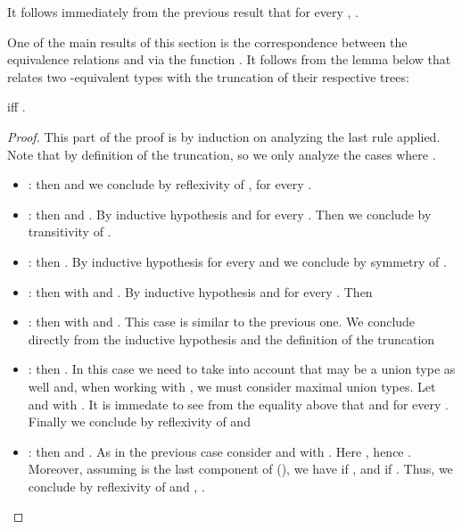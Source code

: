 \begin{remark}
\label{rem:cutFiniteUnfolding}
It follows immediately from the previous result that for every ,
.
\end{remark}



One of the main results of this section is the correspondence between the
equivalence relations  and  via the function
. It follows from the lemma below that relates two
-equivalent types with the truncation of their respective trees:

\begin{lemma}
\label{lem:cutEquivalenceMu}
 iff .
\end{lemma}

\begin{proof}
 This part of the proof is by induction on 
analyzing the last rule applied. Note that  by definition of the truncation, so we only analyze the
cases where .
\begin{itemize}
  \item : then  and we conclude by reflexivity of
  ,  for every
  .

  \item : then  and . By
  inductive hypothesis 
  and  for every .
  Then we conclude by transitivity of .
  
  \item : then . By inductive hypothesis
   for every  and
  we conclude by symmetry of .
  
  \item : then 
  with  and . By inductive hypothesis
   and
   for every .
  Then 
  
  \item : then 
  with  and . This case is similar to the
  previous one. We conclude directly from the inductive hypothesis and the
  definition of the truncation 
  
  \item : then . In this case we need
  to take into account that  may be a union type as well and, when working
  with , we must consider maximal union types. Let
   and
   with . It is immedate to see from the equality above that
   and  for every . Finally we
  conclude by reflexivity of  and  
  
  \item : then  and . As in the previous case consider  and  with . Here , hence
  . Moreover, assuming  is the last component of  (), we have  if , and  if . Thus, we conclude by reflexivity of 
  and , .
  

\end{itemize}
\end{proof}
